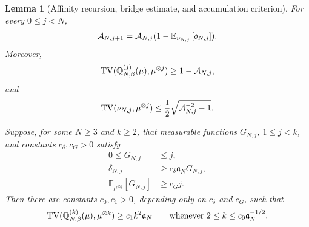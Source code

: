 \documentclass[11pt,reqno]{amsart}
\numberwithin{equation}{section}
\theoremstyle{plain}
\newtheorem{lemma}[lemma]{Lemma}
\theoremstyle{remark}
\DeclarePairedDelimiter{\pa}{\lparen}{\rparen}
\newcommand{\E}{{\mathbb{E}}}
\newcommand{\Q}{{\mathbb{Q}}}
\newcommand{\be}{\beta}
\newcommand{\TV}{\operatorname{TV}}
\begin{document}
\begin{lemma}[Affinity recursion, bridge estimate, and accumulation criterion]
\label{lem:uv-critical-affinity-recursion}
For every \(0\le j<N\),
\begin{align}\label{eq:uv-critical-affinity-recursion}
 \mathcal A_{N,j+1}
 =\mathcal A_{N,j}\pa{1-\E_{\nu_{N,j}}\left[\delta_{N,j}\right]}.
\end{align}
Moreover,
\begin{align}\label{eq:uv-critical-TV-affinity-lower}
 \TV\pa{\Q_{N,\be}^{(j)}(\mu),\mu^{\otimes j}}
 \ge1-\mathcal A_{N,j},
\end{align}
and
\begin{align}\label{eq:uv-critical-bridge-TV-bound}
 \TV\pa{\nu_{N,j},\mu^{\otimes j}}
 \le\frac12\sqrt{\mathcal A_{N,j}^{-2}-1}.
\end{align}

Suppose, for some \(N\ge3\) and \(k\ge2\), that measurable functions \(G_{N,j}\), \(1\le j<k\), and constants \(c_\delta,c_G>0\) satisfy
\begin{align}
 0\le G_{N,j}&\le j,
 \label{eq:uv-critical-abstract-count-range}\\
 \delta_{N,j}&\ge c_\delta\mathfrak a_NG_{N,j},
 \label{eq:uv-critical-abstract-deficit}\\
 \E_{\mu^{\otimes j}}\left[G_{N,j}\right]&\ge c_Gj.
 \label{eq:uv-critical-abstract-count}
\end{align}
Then there are constants \(c_0,c_1>0\), depending only on \(c_\delta\) and \(c_G\), such that
\begin{align}\label{eq:uv-critical-abstract-accumulation}
 \TV\pa{\Q_{N,\be}^{(k)}(\mu),\mu^{\otimes k}}
 \ge c_1k^2\mathfrak a_N
 \qquad\text{whenever \(2\le k\le c_0\mathfrak a_N^{-1/2}\)}.
\end{align}
\end{lemma}
\end{document}
